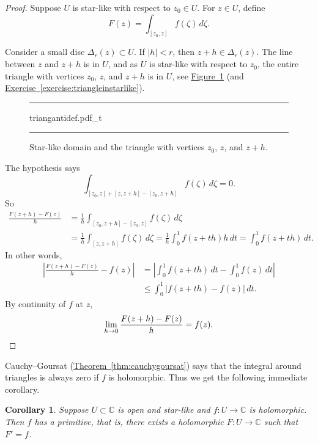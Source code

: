 \documentclass[12pt,openany]{book}
\newcommand{\sabs}[1]{\lvert {#1} \rvert}
\newcommand{\abs}[1]{\left\lvert {#1} \right\rvert}
\newcommand{\C}{{\mathbb{C}}}
\theoremstyle{plain}
\newtheorem{cor}[thm]{Corollary}
\theoremstyle{remark}
\theoremstyle{definition}
\newenvironment{myfig}{%
\begin{figure}[h!t]
\noindent\rule{\textwidth}{0.5pt}\vspace{12pt}\par\centering}%
{\par\noindent\rule{\textwidth}{0.5pt}
\end{figure}}
\theoremstyle{exercise}
\theoremstyle{example}
\newcommand{\figureref}[1]{\hyperref[#1]{Figure~\ref*{#1}}}
\newcommand{\exerciseref}[1]{\hyperref[#1]{Exercise~\ref*{#1}}}
\newcommand{\thmref}[1]{\hyperref[#1]{Theorem~\ref*{#1}}}
\begin{document}
\begin{proof}
Suppose $U$ is star-like with respect to $z_0 \in U$.
For $z \in U$, define
\begin{equation*}
F(z) = \int_{[z_0,z]} f(\zeta) \, d\zeta .
\end{equation*}

Consider a small disc $\Delta_r(z) \subset U$.
If $\sabs{h} < r$, then
$z+h \in \Delta_r(z)$.
The line between $z$ and $z+h$ is in $U$, and
as $U$ is star-like with respect to $z_0$, 
the entire triangle with
vertices $z_0$, $z$, and $z+h$
is in $U$, see \figureref{fig:triangantidef}
(and \exerciseref{exercise:triangleinstarlike}).
\begin{myfig}
{triangantidef.pdf_t}
\caption{Star-like domain and the triangle with vertices
$z_0$, $z$, and $z+h$.\label{fig:triangantidef}}
\end{myfig}

The
hypothesis says
\begin{equation*}
\int_{[z_0,z]+[z,z+h]-[z_0,z+h]} f(\zeta) \, d\zeta = 0 .
\end{equation*}
So
\begin{equation*}
\begin{split}
\frac{F(z+h)-F(z)}{h} &=
\frac{1}{h}
\int_{[z_0,z+h]-[z_0,z]} f(\zeta) \, d\zeta
\\
& =
\frac{1}{h}
\int_{[z,z+h]} f(\zeta) \, d\zeta
=
\frac{1}{h}
\int_0^1 f(z+th) h \, dt
=
\int_0^1 f(z+th) \, dt .
\end{split}
\end{equation*}
In other words,
\begin{equation*}
\begin{split}
\abs{
\frac{F(z+h)-F(z)}{h} 
-
f(z)
}
& =
\abs{
\int_0^1 f(z+th) \, dt
-
\int_0^1 f(z) \, dt
}
\\
& \leq
\int_0^1 \abs{f(z+th)-f(z)} \, dt .
\end{split}
\end{equation*}
By continuity of $f$ at $z$,
\begin{equation*}
\lim_{h \to 0}
\frac{F(z+h)-F(z)}{h} 
=
f(z) . \qedhere
\end{equation*}
\end{proof}

Cauchy--Goursat (\thmref{thm:cauchygoursat}) says that the integral around
triangles is always zero if $f$ is holomorphic.  Thus we get
the following immediate corollary.

\begin{cor} \label{cor:primitiveinstarlike}
Suppose $U \subset \C$ is open and star-like
and $f \colon U \to \C$ is holomorphic.
Then $f$ has a primitive, that is,
there exists a holomorphic $F \colon U \to \C$
such that $F' = f$.
\end{cor}
\end{document}
